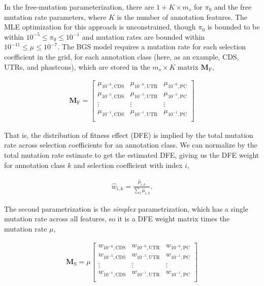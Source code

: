 \documentclass[11pt]{article}
\begin{document}
In the free-mutation parameterization, there are $1 + K \times m_s$ for $\pi_0$
and the free mutation rate parameters, where $K$ is the number of annotation
features. The MLE optimization for this approach is unconstrained, though
$\pi_0$ is bounded to be within $10^{-5} \le \pi_0 \le 10^{-1}$ and mutation
rates are bounded within $10^{-11} \le \mu \le 10^{-7}$. The BGS model requires
a mutation rate for each selection coefficient in the grid, for each annotation
class (here, as an example, CDS, UTRs, and phastcons), which are stored in the
$m_s \times K$ matrix $\mathbf{M}_\text{F}$,

\begin{align}
  \mathbf{M}_\text{F} = \begin{bmatrix}
    \mu_{10^{-6},\text{CDS}} & \mu_{10^{-6},\text{UTR}} & \mu_{10^{-6},\text{PC}} \\
    \mu_{10^{-5},\text{CDS}} & \mu_{10^{-5},\text{UTR}} & \mu_{10^{-5},\text{PC}} \\
    \vdots & \vdots & \vdots \\
    \mu_{10^{-1},\text{CDS}} & \mu_{10^{-1},\text{UTR}} & \mu_{10^{-1},\text{PC}} \\
  \end{bmatrix}
\end{align}

That is, the distribution of fitness effect (DFE) is implied by
the total mutation rate across selection coefficients for an annotation class.
We can normalize by the total mutation rate estimate to get the estimated DFE,
giving us the DFE weight for annotation class $k$ and selection coefficient
with index $i$,

\begin{align}
  \widehat{w}_{i,k} = \frac{\widehat{\mu}_{i,k}}{\sum_i \widehat{\mu}_{i,k}}.
\end{align}

The second parametrization is the \emph{simplex} parametrization, which has a
single mutation rate across all features, so it is a DFE weight matrix times
the mutation rate $\mu$, 

\begin{align}
  \mathbf{M}_\text{S} = \mu \begin{bmatrix}
    w_{10^{-6},\text{CDS}} & w_{10^{-6},\text{UTR}} & w_{10^{-6},\text{PC}} \\
    w_{10^{-5},\text{CDS}} & w_{10^{-5},\text{UTR}} & w_{10^{-5},\text{PC}} \\
    \vdots & \vdots & \vdots \\
    w_{10^{-1},\text{CDS}} & w_{10^{-1},\text{UTR}} & w_{10^{-1},\text{PC}} \\
  \end{bmatrix}
\end{align}
\end{document}
